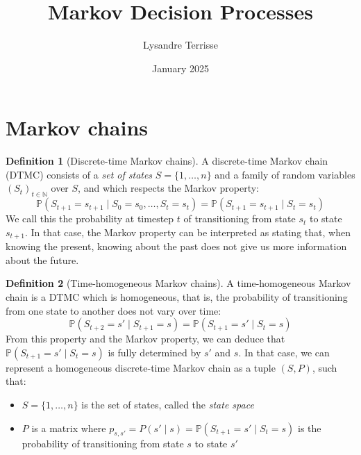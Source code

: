 \documentclass{article}
\title{Markov Decision Processes}
\author{Lysandre Terrisse}
\date{January 2025}
\theoremstyle{definition}
\newtheorem{definition}{Definition}[section]
\theoremstyle{remark}
\theoremstyle{example}
\begin{document}
\maketitle


\section{Markov chains}

\begin{definition}[Discrete-time Markov chains]
		A discrete-time Markov chain (DTMC) consists of a \textit{set of states} $S = \{1, \dots, n\}$ and a family of random variables $(S_t)_{t \in \mathbb{N}}$ over $S$, and which respects the Markov property:
				$$\mathbb{P}(S_{t+1} = s_{t+1} \mid S_0 = s_0, \dots, S_t = s_t) = \mathbb{P}(S_{t+1} = s_{t+1} \mid S_t = s_t)$$
		We call this the probability at timestep $t$ of transitioning from state $s_t$ to state $s_{t+1}$. In that case, the Markov property can be interpreted as stating that, when knowing the present, knowing about the past does not give us more information about the future.
\end{definition}

\begin{definition}[Time-homogeneous Markov chains]
		A time-homogeneous Markov chain is a DTMC which is homogeneous, that is, the probability of transitioning from one state to another does not vary over time:
				$$\mathbb{P}(S_{t+2} = s' \mid S_{t+1} = s) = \mathbb{P}(S_{t+1} = s' \mid S_t = s)$$
		From this property and the Markov property, we can deduce that $\mathbb{P}(S_{t+1} = s' \mid S_t = s)$ is fully determined by $s'$ and $s$. In that case, we can represent a homogeneous discrete-time Markov chain as a tuple $(S, P)$, such that:
		\begin{itemize}
				\item $S = \{1, \dots, n\}$ is the set of states, called the \textit{state space}
				\item $P$ is a matrix where $p_{s,s'} = P(s' \mid s) = \mathbb{P}(S_{t+1}= s' \mid S_t = s)$ is the probability of transitioning from state $s$ to state $s'$
		\end{itemize}
\end{definition}
\end{document}
